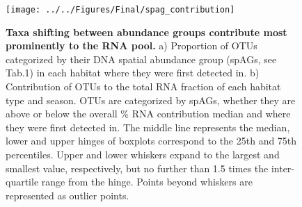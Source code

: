 \documentclass[12pt,a4paper]{article} %
\begin{document}
\begin{figure}[!ht]
\centering
\texttt{[image: ../../Figures/Final/spag\_contribution]}
\caption{\textbf{Taxa shifting between abundance groups contribute most prominently to the RNA pool.} a) Proportion of OTUs categorized by their DNA spatial abundance group (spAGs, see Tab.1) in each habitat where they were first detected in. b) Contribution of OTUs to the total RNA fraction of each habitat type and season. OTUs are categorized by spAGs, whether they are above or below the overall \% RNA contribution median and where they were first detected in. The middle line represents the median, lower and upper hinges of boxplots correspond to the 25th and 75th percentiles. Upper and lower whiskers expand to the largest and smallest value, respectively, but no further than 1.5 times the inter-quartile range from the hinge. Points beyond whiskers are represented as outlier points.}
\end{figure}
\end{document}
